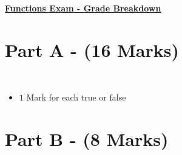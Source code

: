 \documentclass[12pt]{article} %
\begin{document}
	\renewcommand*{\coursecode}{MATH 235} %
	\renewcommand*{\assgnnumber}{Assignment 1} %
	\renewcommand*{\submdate}{September 14, 2021} %
	\renewcommand*{\studentfname}{Abdullah} %
	\renewcommand*{\studentlname}{Zubair} %
    \renewcommand*{\proofname}{Proof:}

	\renewcommand\qedsymbol{$\blacksquare$}
	\setfigpath
	\fancyhfoffset[L,O]{0pt} %




\begin{center}
	\textbf{\underline{\Huge{Functions Exam - Grade Breakdown}}}
\end{center}

\section*{Part A - (16 Marks)}

\begin{qstn}[16 Marks] \texttt{  }
  \begin{itemize}
    \item $1$ Mark for each true or false
  \end{itemize}
\end{qstn}

\section*{Part B - (8 Marks)}
\end{document}
